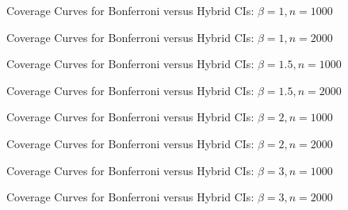 \begin{figure}
  \centering
  
  \caption{Coverage Curves for Bonferroni versus Hybrid CIs: $\beta = 1, n = 1000$}
\end{figure}

\begin{figure}
  \centering
  
  \caption{Coverage Curves for Bonferroni versus Hybrid CIs: $\beta = 1, n = 2000$}
\end{figure}

\begin{figure}
  \centering
  
  \caption{Coverage Curves for Bonferroni versus Hybrid CIs: $\beta = 1.5, n = 1000$}
\end{figure}

\begin{figure}
  \centering
  
  \caption{Coverage Curves for Bonferroni versus Hybrid CIs: $\beta = 1.5, n = 2000$}
\end{figure}

\begin{figure}
  \centering
  
  \caption{Coverage Curves for Bonferroni versus Hybrid CIs: $\beta = 2, n = 1000$}
\end{figure}

\begin{figure}
  \centering
  
  \caption{Coverage Curves for Bonferroni versus Hybrid CIs: $\beta = 2, n = 2000$}
\end{figure}

\begin{figure}
  \centering
  
  \caption{Coverage Curves for Bonferroni versus Hybrid CIs: $\beta = 3, n = 1000$}
\end{figure}

\begin{figure}
  \centering
  
  \caption{Coverage Curves for Bonferroni versus Hybrid CIs: $\beta = 3, n = 2000$}
\end{figure}
